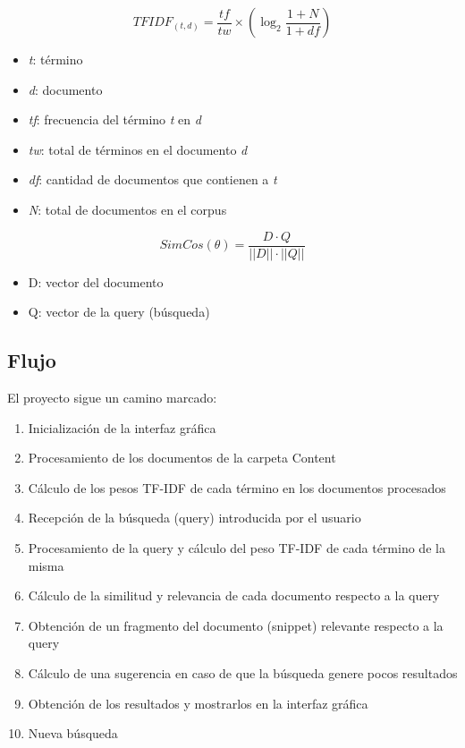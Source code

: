 \documentclass[12pt,a4paper]{article}
\begin{document}
\begin{equation}\label{equ:tfidf}
    TFIDF_{(t,d)} = \frac{tf}{tw} \times (\log_2\frac{1+N}{1+df})
\end{equation}
\begin{itemize}
    \item \emph{t}: término
    \item \emph{d}: documento
    \item \emph{tf}: frecuencia del término \emph{t} en \emph{d}
    \item \emph{tw}: total de términos en el documento \emph{d}
    \item \emph{df}: cantidad de documentos que contienen a \emph{t}
    \item \emph{N}: total de documentos en el corpus
\end{itemize}
\begin{equation}\label{equ:simcos}
    SimCos(\theta) = \frac{D \cdot Q}{||D|| \cdot ||Q||}
\end{equation}
\begin{itemize}
    \item D: vector del documento
    \item Q: vector de la query (búsqueda)
\end{itemize}


\subsection{Flujo}\label{sub:flow}
El proyecto sigue un camino marcado:
\begin{enumerate}
    \item Inicialización de la interfaz gráfica
    \item Procesamiento de los documentos de la carpeta Content
    \item Cálculo de los pesos TF-IDF de cada término en los documentos procesados
    \item Recepción de la búsqueda (query) introducida por el usuario
    \item Procesamiento de la query y cálculo del peso TF-IDF de cada término de la misma
    \item Cálculo de la similitud y relevancia de cada documento respecto a la query
    \item Obtención de un fragmento del documento (snippet) relevante respecto a la query
    \item Cálculo de una sugerencia en caso de que la búsqueda genere pocos resultados 
    \item Obtención de los resultados y mostrarlos en la interfaz gráfica
    \item Nueva búsqueda
\end{enumerate}
\end{document}
